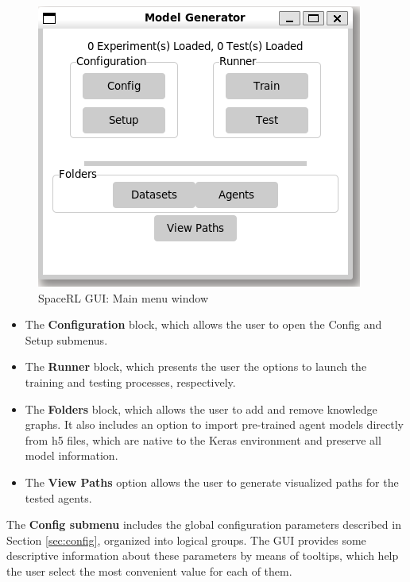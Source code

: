 \begin{figure}[!h]
    \centering
    \includegraphics[width=.45\textwidth]{fig/framework/GUI/mm_default}
    \caption{SpaceRL GUI: Main menu window}
    \label{fig:mm_default}
\end{figure}

\begin{itemize}
    \item The \textbf{Configuration} block, which allows the user to open the Config and Setup submenus.
    
    \item The \textbf{Runner} block, which presents the user the options to launch the training and testing processes, respectively.
    
    \item The \textbf{Folders} block, which allows the user to add and remove knowledge graphs. It also includes an option to import pre-trained agent models directly from h5 files, which are native to the Keras environment and preserve all model information.
    
    \item The \textbf{View Paths} option allows the user to generate visualized paths for the tested agents.
\end{itemize}

The \textbf{Config submenu} includes the global configuration parameters described in Section \ref{sec:config}, organized into logical groups. The GUI provides some  descriptive information about these parameters by means of tooltips, which help the user select the most convenient value for each of them. 

